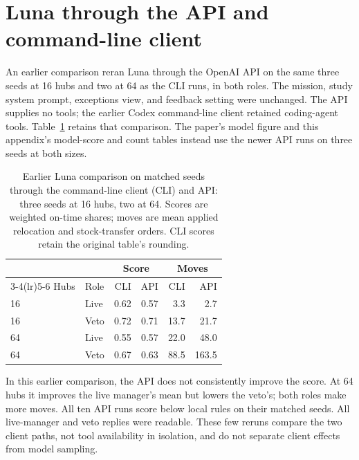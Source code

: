 \documentclass[conference]{IEEEtran}
\begin{document}
\begin{table}[h]
\caption{Per-seed on-time score and moves for the 48 model runs, in seed
order within each cell.}
\label{tab:scores}
\centering
\footnotesize
\setlength{\tabcolsep}{2pt}

\end{table}

\section{Luna through the API and command-line client}
\label{app:luna-api}

An earlier comparison reran Luna through the OpenAI API on the same
three seeds at 16 hubs and two at 64 as the CLI runs, in both roles. The
mission, study system prompt, exceptions view, and feedback setting were
unchanged. The API supplies no tools;
the earlier Codex command-line client retained coding-agent tools.
Table~\ref{tab:luna-api} retains that comparison. The paper's model figure
and this appendix's model-score and count tables instead use the newer
API runs on three seeds at both sizes.

\begin{table}[h]
\caption{Earlier Luna comparison on matched seeds through the
command-line client (CLI) and API: three seeds at 16 hubs, two at 64.
Scores are weighted on-time shares; moves are mean applied relocation
and stock-transfer orders. CLI scores retain the original table's rounding.}
\label{tab:luna-api}
\centering
\footnotesize
\begin{tabular}{llrrrr}
\toprule
& & \multicolumn{2}{c}{Score} & \multicolumn{2}{c}{Moves} \\
\cmidrule(lr){3-4}\cmidrule(lr){5-6}
Hubs & Role & CLI & API & CLI & API \\
\midrule
16 & Live & 0.62 & 0.57 & 3.3 & 2.7 \\
16 & Veto & 0.72 & 0.71 & 13.7 & 21.7 \\
64 & Live & 0.55 & 0.57 & 22.0 & 48.0 \\
64 & Veto & 0.67 & 0.63 & 88.5 & 163.5 \\
\bottomrule
\end{tabular}
\end{table}

In this earlier comparison, the API does not consistently improve the
score. At 64 hubs it improves the live manager's mean but lowers the
veto's; both roles make more moves.
All ten API runs score below local rules on their matched seeds. All
live-manager and veto replies were readable.
These few reruns compare the two client paths, not tool availability in
isolation, and do not separate client effects from model sampling.
\end{document}

